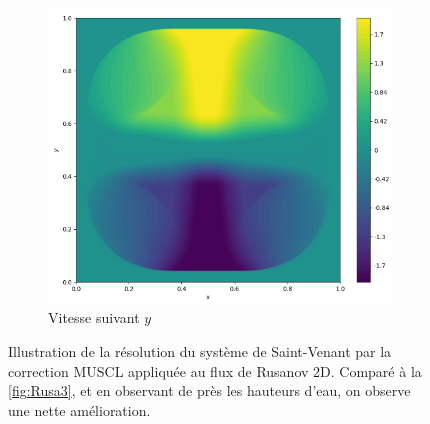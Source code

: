 \documentclass[
	french,
	11pt, %
]{fphw}
\begin{document}
\begin{figure}[H]
\begin{subfigure}{0.32\textwidth}
		\label{fig:Muscl1u}
	\end{subfigure}
	\begin{subfigure}{0.32\textwidth}
		\centering
		\includegraphics[width=\textwidth,height=0.85\textwidth]{Muscl1v.png}
		\caption{Vitesse suivant $y$}
		\label{fig:Muscl1v}
	\end{subfigure}
	\caption{Illustration de la résolution du système de Saint-Venant par la correction MUSCL appliquée au flux de Rusanov 2D. Comparé à la \cref{fig:Rusa3}, et en observant de près les hauteurs d'eau, on observe une nette amélioration.}
	\label{fig:Muscl1}
\end{figure}
\end{document}
